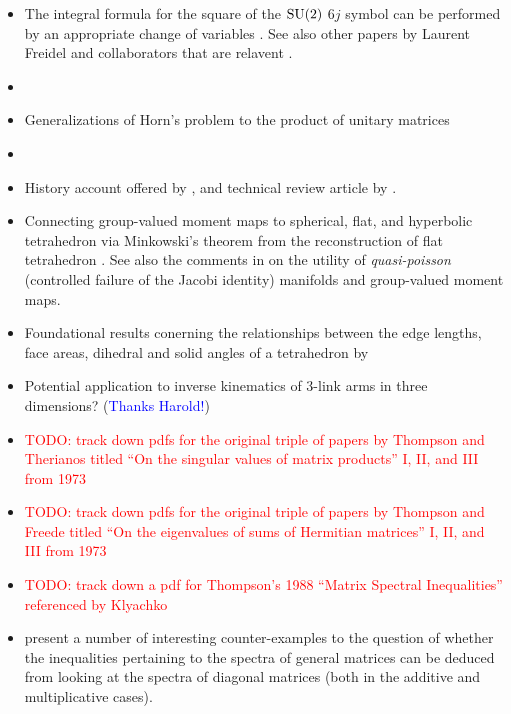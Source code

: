 \documentclass[notitlepage, 10pt]{article}
\begin{document}
\begin{itemize}
    \item The integral formula for the square of the $\operatorname{SU}(2)$ $6j$ symbol can be performed by an appropriate change of variables \cite{freidel2003asymptotics}. See also other papers by Laurent Freidel and collaborators that are relavent \cite{freidel2000simple,freidel20076j,freidel2010holomorphic}.
    \item \citeauthor{speyer2005horn} \cite{speyer2005horn}
    \item Generalizations of Horn's problem to the product of unitary matrices \cite{agnihotri1997eigenvalues,belkale2008quantum,belkale2016multiplicative}
    \item \citeauthor{bhatia2001linear} \cite{bhatia2001linear}
    \item History account offered by \citeauthor{daftuar2005quantum} \cite{daftuar2005quantum}, and technical review article by \citeauthor{fulton2000eigenvalues} \cite{fulton2000eigenvalues}.
    \item Connecting group-valued moment maps to spherical, flat, and hyperbolic tetrahedron via Minkowski's theorem from the reconstruction of flat tetrahedron \citeauthor{haggard2016encoding}. See also the comments in \cite[Section 11]{haggard2016encoding} on the utility of \textit{quasi-poisson} (controlled failure of the Jacobi identity) manifolds and group-valued moment maps.
    \item Foundational results conerning the relationships between the edge lengths, face areas, dihedral and solid angles of a tetrahedron by \citeauthor{richardson1902trigonometry} \cite{richardson1902trigonometry}
    \item Potential application to inverse kinematics of $3$-link arms in three dimensions? (\textcolor{blue}{Thanks Harold!})
    \item \textcolor{red}{TODO: track down pdfs for the original triple of papers by Thompson and Therianos titled ``On the singular values of matrix products'' I, II, and III from 1973}
    \item \textcolor{red}{TODO: track down pdfs for the original triple of papers by Thompson and Freede titled ``On the eigenvalues of sums of Hermitian matrices'' I, II, and III from 1973}
    \item \textcolor{red}{TODO: track down a pdf for Thompson's 1988 ``Matrix Spectral Inequalities'' referenced by Klyachko}
    \item {} \cite{thompson1973eigenvalues} present a number of interesting counter-examples to the question of whether the inequalities pertaining to the spectra of general matrices can be deduced from looking at the spectra of diagonal matrices (both in the additive and multiplicative cases).

\end{itemize}
\end{document}
